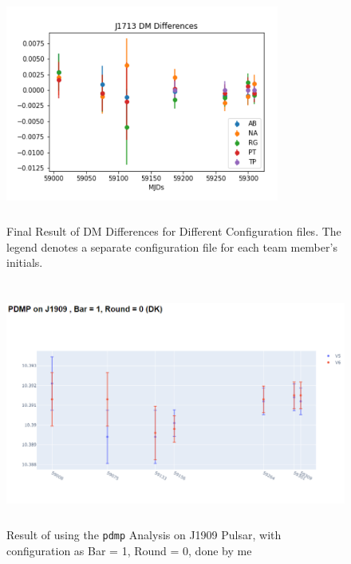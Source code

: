 \documentclass{article}
\begin{document}
\begin{figure}[htbp]
    \centering
    \includegraphics[height=7cm,width=9cm]{Images/V2_9.png}
    \caption{Final Result of DM Differences for Different Configuration files. The legend denotes a separate configuration file for each team member's initials. }
\begin{center}
\includegraphics[height=8cm,width=12cm]{Images/Pulsar13.png}
\caption{Result of using the {\tt pdmp} Analysis on J1909 Pulsar, with configuration as Bar = 1, Round = 0, done by me}
\end{center}


\end{figure}
\end{document}

